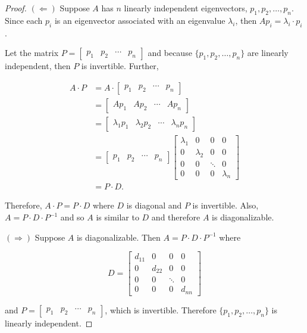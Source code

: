 \documentclass[12pt]{article}
\theoremstyle{definition}
\begin{document}
\begin{proof}
$(\Leftarrow)$ Suppose $A$ has $n$ linearly independent eigenvectors, $p_1, p_2, \ldots, p_n$.
Since each $p_i$ is an eigenvector associated with an eigenvalue $\lambda_i$, then
$A p_i = \lambda_i \cdot p_i$.

Let the matrix $P = \begin{bmatrix} p_1 & p_2 & \cdots & p_n \end{bmatrix}$ and because
$\{p_1, p_2, \ldots, p_n\}$ are linearly independent, then $P$ is invertible. Further,

\begin{align*}
A \cdot P &= A \cdot \begin{bmatrix} p_1 & p_2 & \cdots & p_n \end{bmatrix}\\
&= \begin{bmatrix} Ap_1 & Ap_2 & \cdots & Ap_n \end{bmatrix} \\
&= \begin{bmatrix} \lambda_1 p_1 & \lambda_2 p_2 & \cdots & \lambda_n p_n \end{bmatrix} \\
&= \begin{bmatrix} p_1 & p_2 & \cdots & p_n \end{bmatrix}
\begin{bmatrix}
\lambda_1 & 0 & 0 & 0\\
0 & \lambda_2 & 0 & 0\\
0 & 0 & \ddots & 0 \\
0& 0 & 0 & \lambda_n
\end{bmatrix} \\
&= P \cdot D.
\end{align*}

Therefore, $A \cdot P = P \cdot D$ where $D$ is diagonal and $P$ is invertible. Also,
$A = P \cdot D \cdot P^{-1}$ and so $A$ is similar to $D$ and therefore $A$ is
diagonalizable.

$(\Rightarrow)$ Suppose $A$ is diagonalizable. Then $A = P \cdot D \cdot P^{-1}$ where

\[ D =
\begin{bmatrix}
d_{11} & 0 & 0 & 0\\
0 & d_{22} & 0 & 0\\
0 & 0 & \ddots & 0 \\
0& 0 & 0 & d_{nn}
\end{bmatrix}
\]

and $P = \begin{bmatrix} p_1 & p_2 & \cdots & p_n \end{bmatrix}$, which is invertible.
Therefore $\{p_1, p_2, \ldots, p_n\}$ is linearly independent.


\end{proof}
\end{document}
